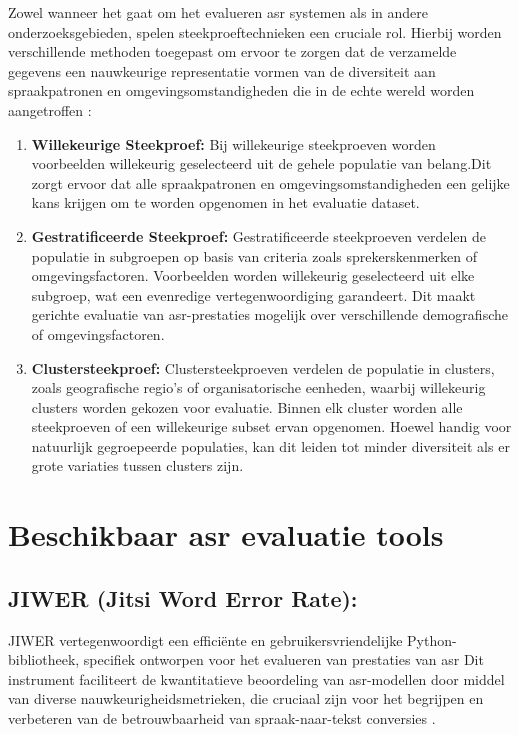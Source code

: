 Zowel wanneer het gaat om het evalueren \gls{asr} systemen als in andere onderzoeksgebieden, spelen steekproeftechnieken een cruciale rol. Hierbij worden verschillende methoden toegepast om ervoor te zorgen dat de verzamelde gegevens een nauwkeurige representatie vormen van de diversiteit aan spraakpatronen en omgevingsomstandigheden die in de echte wereld worden aangetroffen \autocite{huggingface2023asr}:
\begin{enumerate}[label=\arabic*.]
 
    \item \textbf{Willekeurige Steekproef:}
        Bij willekeurige steekproeven worden voorbeelden willekeurig geselecteerd uit de gehele populatie van belang.Dit zorgt ervoor dat alle spraakpatronen en omgevingsomstandigheden een gelijke kans krijgen om te worden opgenomen in het evaluatie dataset.
        
    \item \textbf{Gestratificeerde Steekproef:}
        Gestratificeerde steekproeven verdelen de populatie in subgroepen op basis van criteria zoals sprekerskenmerken of omgevingsfactoren. Voorbeelden worden willekeurig geselecteerd uit elke subgroep, wat een evenredige vertegenwoordiging garandeert. Dit maakt gerichte evaluatie van \gls{asr}-prestaties mogelijk over verschillende demografische of omgevingsfactoren.
        
    \item \textbf{Clustersteekproef:}
        Clustersteekproeven verdelen de populatie in clusters, zoals geografische regio's of organisatorische eenheden, waarbij willekeurig clusters worden gekozen voor evaluatie. Binnen elk cluster worden alle steekproeven of een willekeurige subset ervan opgenomen. Hoewel handig voor natuurlijk gegroepeerde populaties, kan dit leiden tot minder diversiteit als er grote variaties tussen clusters zijn.
         
\end{enumerate}


\section{Beschikbaar \gls{asr} evaluatie tools}
\subsection{JIWER (Jitsi Word Error Rate):} JIWER vertegenwoordigt een efficiënte en gebruikersvriendelijke Python-bibliotheek, specifiek ontworpen voor het evalueren van prestaties van \gls{asr} Dit instrument faciliteert de kwantitatieve beoordeling van \gls{asr}-modellen door middel van diverse nauwkeurigheidsmetrieken, die cruciaal zijn voor het begrijpen en verbeteren van de betrouwbaarheid van spraak-naar-tekst conversies \autocite{jiwer2023}.

